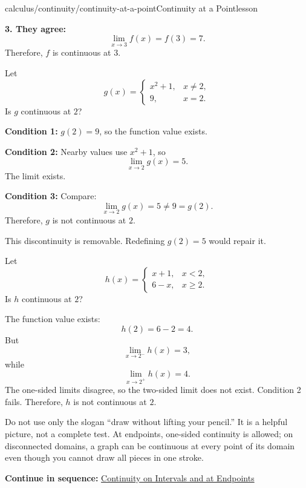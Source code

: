 \documentclass[11pt,openany]{book}
\theoremstyle{bgplain}
\newcounter{bgexample}[chapter]
\newcommand{\webnext}[2]{%
  \par\addvspace{1.2em}\noindent{\color{BGLine}\rule{\textwidth}{0.35pt}}\par\smallskip
  {\small\color{BGGray}\textbf{Continue in sequence:} \hyperlink{web:#1}{#2}}\par
}
\begin{document}
\begin{webpage}{calculus/continuity/continuity-at-a-point}{Continuity at a Point}{lesson}
\begin{bgguided}[title={A continuous line}]
\begin{bgsolution}
\textbf{3. They agree:}
\[
  \lim_{x\to3}f(x)=f(3)=7.
\]
Therefore, \(f\) is continuous at \(3\).
\end{bgsolution}
\end{bgguided}

\begin{bgexample}[title={A limit exists but continuity fails}]
Let
\[
  g(x)=
  \begin{cases}
    x^2+1,&x\ne2,\\
    9,&x=2.
  \end{cases}
\]
Is \(g\) continuous at \(2\)?

\begin{bgsolution}
\textbf{Condition 1:} \(g(2)=9\), so the function value exists.

\textbf{Condition 2:} Nearby values use \(x^2+1\), so
\[
  \lim_{x\to2}g(x)=5.
\]
The limit exists.

\textbf{Condition 3:} Compare:
\[
  \lim_{x\to2}g(x)=5\ne9=g(2).
\]
Therefore, \(g\) is not continuous at \(2\).

This discontinuity is removable. Redefining \(g(2)=5\) would repair it.
\end{bgsolution}
\end{bgexample}

\begin{bgexample}[title={Continuity fails because no two-sided limit exists}]
Let
\[
  h(x)=
  \begin{cases}
    x+1,&x<2,\\
    6-x,&x\ge2.
  \end{cases}
\]
Is \(h\) continuous at \(2\)?

\begin{bgsolution}
The function value exists:
\[
  h(2)=6-2=4.
\]
But
\[
  \lim_{x\to2^-}h(x)=3,
\]
while
\[
  \lim_{x\to2^+}h(x)=4.
\]
The one-sided limits disagree, so the two-sided limit does not exist. Condition 2 fails. Therefore, \(h\) is not continuous at \(2\).
\end{bgsolution}
\end{bgexample}

\begin{bgexamnote}
Do not use only the slogan ``draw without lifting your pencil.'' It is a helpful picture, not a complete test. At endpoints, one-sided continuity is allowed; on disconnected domains, a graph can be continuous at every point of its domain even though you cannot draw all pieces in one stroke.
\end{bgexamnote}
\webnext{calculus/continuity/intervals-endpoints}{Continuity on Intervals and at Endpoints}
\end{webpage}
\end{document}
